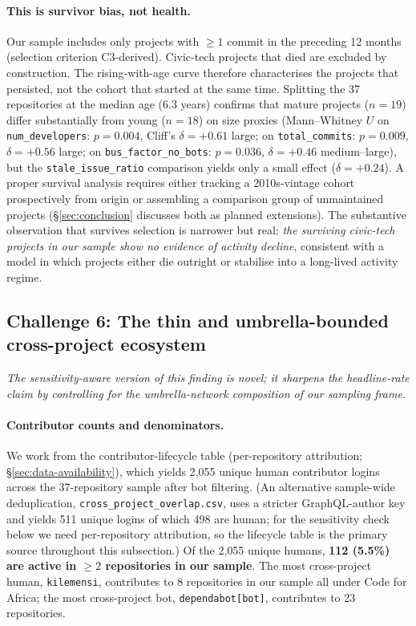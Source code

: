 \documentclass[a4paper,UKenglish,cleveref,autoref,thm-restate]{lipics-v2021}
\begin{document}
\paragraph{This is survivor bias, not health.}
Our sample includes only projects with $\geq 1$ commit in the preceding 12 months (selection criterion C3-derived). Civic-tech projects that died are excluded by construction. The rising-with-age curve therefore characterises the projects that persisted, not the cohort that started at the same time. Splitting the 37 repositories at the median age (6.3 years) confirms that mature projects ($n = 19$) differ substantially from young ($n = 18$) on size proxies (Mann--Whitney $U$ on \texttt{num\_developers}: $p = 0.004$, Cliff's $\delta = +0.61$ large; on \texttt{total\_commits}: $p = 0.009$, $\delta = +0.56$ large; on \texttt{bus\_factor\_no\_bots}: $p = 0.036$, $\delta = +0.46$ medium--large), but the \texttt{stale\_issue\_ratio} comparison yields only a small effect ($\delta = +0.24$). A proper survival analysis requires either tracking a 2010s-vintage cohort prospectively from origin or assembling a comparison group of unmaintained projects (\S\ref{sec:conclusion} discusses both as planned extensions). The substantive observation that survives selection is narrower but real: \emph{the surviving civic-tech projects in our sample show no evidence of activity decline}, consistent with a model in which projects either die outright or stabilise into a long-lived activity regime.

\subsection{Challenge 6: The thin and umbrella-bounded cross-project ecosystem}\label{sec:ecosystem}

\emph{The sensitivity-aware version of this finding is novel; it sharpens the headline-rate claim by controlling for the umbrella-network composition of our sampling frame.}

\paragraph{Contributor counts and denominators.}
We work from the contributor-lifecycle table (per-repository attribution; \S\ref{sec:data-availability}), which yields 2{,}055 unique human contributor logins across the 37-repository sample after bot filtering. (An alternative sample-wide deduplication, \texttt{cross\_project\_overlap.csv}, uses a stricter GraphQL-author key and yields 511 unique logins of which 498 are human; for the sensitivity check below we need per-repository attribution, so the lifecycle table is the primary source throughout this subsection.) Of the 2{,}055 unique humans, \textbf{112 (5.5\%) are active in $\geq 2$ repositories in our sample}. The most cross-project human, \texttt{kilemensi}, contributes to 8 repositories in our sample all under Code for Africa; the most cross-project bot, \texttt{dependabot[bot]}, contributes to 23 repositories.
\end{document}
